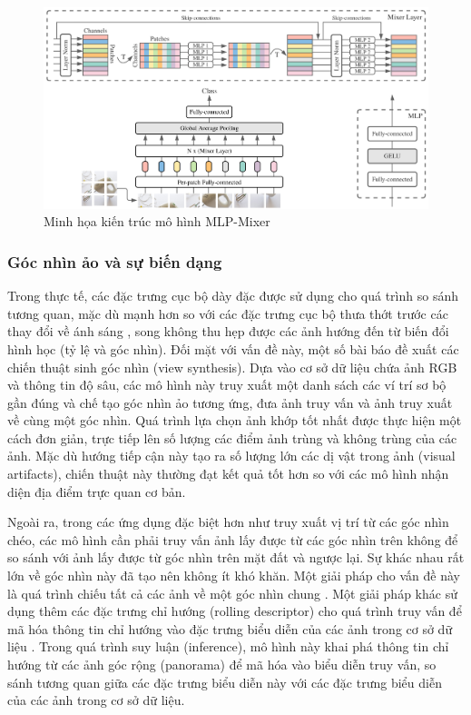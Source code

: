 \begin{figure}[h]
    \centering
    \includegraphics[width=\textwidth]{pics/Chapter2/mlpmixer.png}
    \caption{Minh họa kiến trúc mô hình MLP-Mixer \cite{tolstikhin2021mlpmixer}}
    \label{fig:mlpmixer}
\end{figure}

\subsubsection{Góc nhìn ảo và sự biến dạng}

Trong thực tế, các đặc trưng cục bộ dày đặc được sử dụng cho quá trình so sánh tương quan, mặc dù mạnh hơn so với các đặc trưng cục bộ thưa thớt trước các thay đổi về ánh sáng \cite{zhou2016evaluating}, song không thu hẹp được các ảnh hướng đến từ biến đổi hình học (tỷ lệ và góc nhìn). Đối mặt với vấn đề này, một số bài báo \cite{torii201524, taira2018inloc} đề xuất các chiến thuật sinh góc nhìn (view synthesis). Dựa vào cơ sở dữ liệu chứa ảnh RGB và thông tin độ sâu, các mô hình này truy xuất một danh sách các ví trí sơ bộ gần đúng và chế tạo góc nhìn ảo tương ứng, đưa ảnh truy vấn và ảnh truy xuất về cùng một góc nhìn. Quá trình lựa chọn ảnh khớp tốt nhất được thực hiện một cách đơn giản, trực tiếp lên số lượng các điểm ảnh trùng và không trùng của các ảnh. Mặc dù hướng tiếp cận này tạo ra số lượng lớn các dị vật trong ảnh (visual artifacts), chiến thuật này thường đạt kết quả tốt hơn so với các mô hình nhận diện địa điểm trực quan cơ bản.

Ngoài ra, trong các ứng dụng đặc biệt hơn như truy xuất vị trí từ các góc nhìn chéo, các mô hình cần phải truy vấn ảnh lấy được từ các góc nhìn trên không để so sánh với ảnh lấy được từ góc nhìn trên mặt đất và ngược lại. Sự khác nhau rất lớn về góc nhìn này đã tạo nên không ít khó khăn. Một giải pháp cho vấn đề này là quá trình chiếu tất cả các ảnh về một góc nhìn chung \cite{lin2015learning, castaldo2015semantic}. Một giải pháp khác sử dụng thêm các đặc trưng chỉ hướng (rolling descriptor) cho quá trình truy vấn để mã hóa thông tin chỉ hướng vào đặc trưng biểu diễn của các ảnh trong cơ sở dữ liệu \cite{xia2023convolutional}. Trong quá trình suy luận (inference), mô hình này khai phá thông tin chỉ hướng từ các ảnh góc rộng (panorama) để mã hóa vào biểu diễn truy vấn, so sánh tương quan giữa các đặc trưng biểu diễn này với các đặc trưng biểu diễn của các ảnh trong cơ sở dữ liệu.

